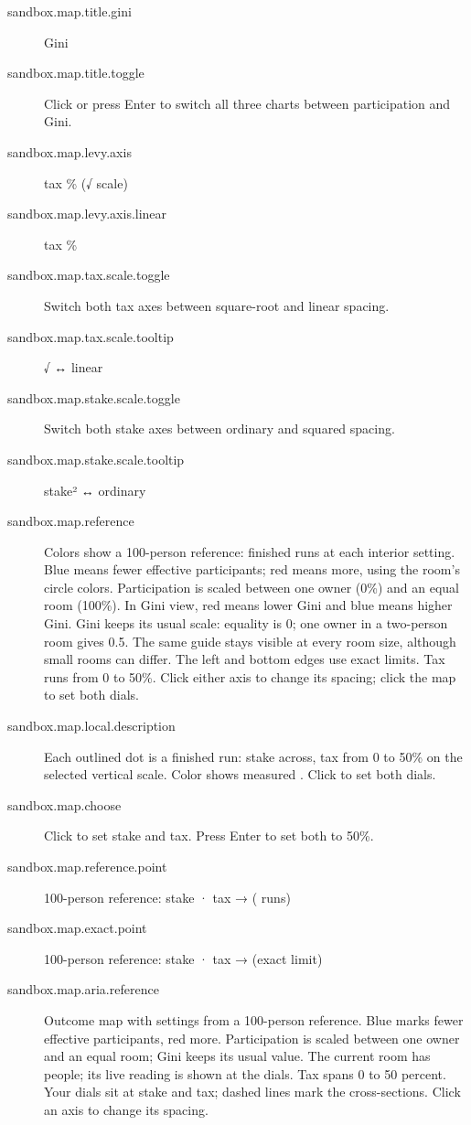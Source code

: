 \begin{description}
  \item[sandbox.map.title.gini] Gini
  \item[sandbox.map.title.toggle] Click or press Enter to switch all three charts between participation and Gini.
  \item[sandbox.map.levy.axis] tax \% (√ scale)
  \item[sandbox.map.levy.axis.linear] tax \%
  \item[sandbox.map.tax.scale.toggle] Switch both tax axes between square-root and linear spacing.
  \item[sandbox.map.tax.scale.tooltip] √ ↔ linear
  \item[sandbox.map.stake.scale.toggle] Switch both stake axes between ordinary and squared spacing.
  \item[sandbox.map.stake.scale.tooltip] stake² ↔ ordinary
  \item[sandbox.map.reference] Colors show a 100-person reference:  finished runs at each interior setting. Blue means fewer effective participants; red means more, using the room's circle colors. Participation is scaled between one owner (0\%) and an equal room (100\%). In Gini view, red means lower Gini and blue means higher Gini. Gini keeps its usual scale: equality is 0; one owner in a two-person room gives 0.5. The same guide stays visible at every room size, although small rooms can differ. The left and bottom edges use exact limits. Tax runs from 0 to 50\%. Click either axis to change its spacing; click the map to set both dials.
  \item[sandbox.map.local.description] Each outlined dot is a finished run: stake across, tax from 0 to 50\% on the selected vertical scale. Color shows measured . Click to set both dials.
  \item[sandbox.map.choose] Click to set stake and tax. Press Enter to set both to 50\%.
  \item[sandbox.map.reference.point] 100-person reference: stake  · tax  →   ( runs)
  \item[sandbox.map.exact.point] 100-person reference: stake  · tax  →   (exact limit)
  \item[sandbox.map.aria.reference] Outcome map with  settings from a 100-person reference. Blue marks fewer effective participants, red more. Participation is scaled between one owner and an equal room; Gini keeps its usual value. The current room has  people; its live reading is shown at the dials. Tax spans 0 to 50 percent. Your dials sit at  stake and  tax; dashed lines mark the cross-sections. Click an axis to change its spacing.

\end{description}
